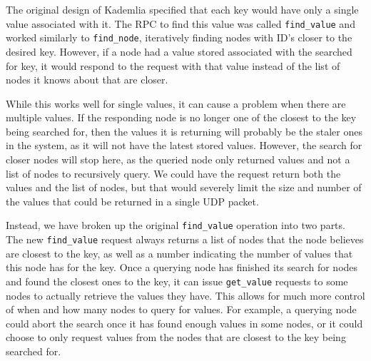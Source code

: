 \documentclass[conference]{IEEEtran}
\begin{document}
The original design of Kademlia specified that each key would have
only a single value associated with it. The RPC to find this value
was called \texttt{find\_value} and worked similarly to
\texttt{find\_node}, iteratively finding nodes with ID's closer to
the desired key. However, if a node had a value stored associated
with the searched for key, it would respond to the request with that
value instead of the list of nodes it knows about that are closer.

While this works well for single values, it can cause a problem when
there are multiple values. If the responding node is no longer one
of the closest to the key being searched for, then the values it is
returning will probably be the staler ones in the system, as it
will not have the latest stored values. However, the search for
closer nodes will stop here, as the queried node only returned
values and not a list of nodes to recursively query. We could have
the request return both the values and the list of nodes, but that
would severely limit the size and number of the values that could be
returned in a single UDP packet.

Instead, we have broken up the original \texttt{find\_value}
operation into two parts. The new \texttt{find\_value} request
always returns a list of nodes that the node believes are closest to
the key, as well as a number indicating the number of values that
this node has for the key. Once a querying node has finished its
search for nodes and found the closest ones to the key, it can issue
\texttt{get\_value} requests to some nodes to actually retrieve the
values they have. This allows for much more control of when and how
many nodes to query for values. For example, a querying node could
abort the search once it has found enough values in some nodes, or
it could choose to only request values from the nodes that are
closest to the key being searched for.
\end{document}
